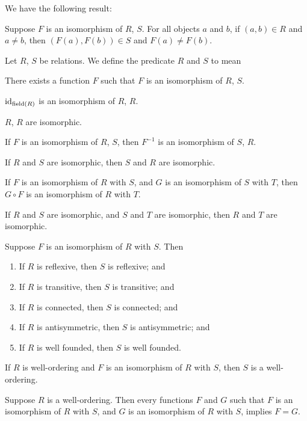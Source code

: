 \documentclass{article}
\begin{document}
We have the following result:
\begin{thm}
\item\label{wellord1:36} Suppose $F$ is an isomorphism of $R$, $S$.
  For all objects $a$ and $b$, if $(a,b)\in R$ and $a\neq b$,
  then $(F(a),F(b))\in S$ and $F(a)\neq F(b)$.
\end{thm}

\begin{definition}
Let $R$, $S$ be relations. We define the predicate $R$ and $S$
 to mean
\begin{defn}
\item There exists a function $F$ such that $F$ is an isomorphism of
  $R$, $S$.
\end{defn}
\end{definition}

\begin{thm}
\item\label{wellord1:37} $\operatorname{id}_{\operatorname{field}(R)}$ is an isomorphism of $R$, $R$.
\item\label{wellord1:38} $R$, $R$ are isomorphic.
\item\label{wellord1:39} If $F$ is an isomorphism of $R$, $S$, then
  $F^{-1}$ is an isomorphism of $S$, $R$.
\item\label{wellord1:40} If $R$ and $S$ are isomorphic, then $S$ and $R$
  are isomorphic.
\item\label{wellord1:41} If $F$ is an isomorphism of $R$ with $S$, and
  $G$ is an isomorphism of $S$ with $T$, then $G\circ F$ is an
  isomorphism of $R$ with $T$.
\item\label{wellord1:42} If $R$ and $S$ are isomorphic, and $S$ and $T$
  are isomorphic, then $R$ and $T$ are isomorphic.
\item\label{wellord1:43} Suppose $F$ is an isomorphism of $R$ with
  $S$. Then
  \begin{enumerate}[label=(\roman*)]
  \item If $R$ is reflexive, then $S$ is reflexive; and
  \item If $R$ is transitive, then $S$ is transitive; and
  \item If $R$ is connected, then $S$ is connected; and
  \item If $R$ is antisymmetric, then $S$ is antisymmetric; and
  \item If $R$ is well founded, then $S$ is well founded.
  \end{enumerate}
\item\label{wellord1:44} If $R$ is well-ordering and $F$ is an
  isomorphism of $R$ with $S$, then $S$ is a well-ordering.
\item\label{wellord1:45} Suppose $R$ is a well-ordering. Then every
  functions $F$ and $G$ such that $F$ is an isomorphism of $R$ with $S$,
  and $G$ is an isomorphism of $R$ with $S$, implies $F=G$.
\end{thm}
\end{document}
